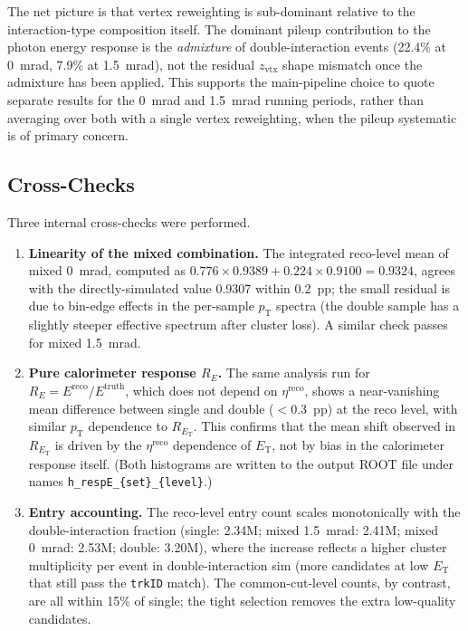 \documentclass[11pt,letterpaper]{article}
\newcommand{\pT}{\ensuremath{p_{\text{T}}}}
\newcommand{\ET}{\ensuremath{E_{\text{T}}}}
\newcommand{\zvtx}{\ensuremath{z_{\mathrm{vtx}}}}
\begin{document}
The net picture is that vertex reweighting is sub-dominant relative to
the interaction-type composition itself. The dominant pileup
contribution to the photon energy response is the \emph{admixture} of
double-interaction events (22.4\% at 0~mrad, 7.9\% at 1.5~mrad), not the
residual $\zvtx$ shape mismatch once the admixture has been applied. This
supports the main-pipeline choice to quote separate results for the
0~mrad and 1.5~mrad running periods, rather than averaging over both
with a single vertex reweighting, when the pileup systematic is of
primary concern.

\subsection{Cross-Checks}
\label{sec:resp_crosschecks}

Three internal cross-checks were performed.

\begin{enumerate}
  \item \textbf{Linearity of the mixed combination.} The integrated
    reco-level mean of mixed 0~mrad, computed as $0.776 \times 0.9389 +
    0.224 \times 0.9100 = 0.9324$, agrees with the directly-simulated
    value 0.9307 within 0.2~pp; the small residual is due to bin-edge
    effects in the per-sample \pT{} spectra (the double sample has a
    slightly steeper effective spectrum after cluster loss). A similar
    check passes for mixed 1.5~mrad.
  \item \textbf{Pure calorimeter response $R_E$.} The same analysis run
    for $R_E = E^{\text{reco}}/E^{\text{truth}}$, which does not depend
    on $\eta^{\text{reco}}$, shows a near-vanishing mean difference
    between single and double ($<$0.3~pp) at the reco level, with
    similar \pT{} dependence to $R_{\ET}$. This confirms that the
    mean shift observed in $R_{\ET}$ is driven by the $\eta^{\text{reco}}$
    dependence of $\ET$, not by bias in the calorimeter response itself.
    (Both histograms are written to the output ROOT file under names
    \texttt{h\_respE\_\{set\}\_\{level\}}.)
  \item \textbf{Entry accounting.} The reco-level entry count scales
    monotonically with the double-interaction fraction (single: 2.34M;
    mixed 1.5~mrad: 2.41M; mixed 0~mrad: 2.53M; double: 3.20M), where
    the increase reflects a higher cluster multiplicity per event in
    double-interaction sim (more candidates at low \ET{} that still pass
    the \texttt{trkID} match). The common-cut-level counts, by contrast,
    are all within 15\% of single; the tight selection removes the extra
    low-quality candidates.
\end{enumerate}
\end{document}
